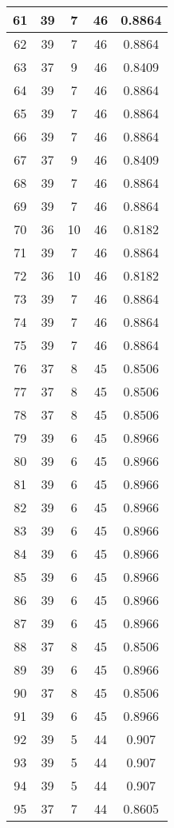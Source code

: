 \documentclass[letterpaper, 12pt]{article}
\begin{document}
\begin{longtable}{|c|c|c|c|c|}
61 & 39 & 7 & 46 & 0.8864 \\
\hline
62 & 39 & 7 & 46 & 0.8864 \\
\hline
63 & 37 & 9 & 46 & 0.8409 \\
\hline
64 & 39 & 7 & 46 & 0.8864 \\
\hline
65 & 39 & 7 & 46 & 0.8864 \\
\hline
66 & 39 & 7 & 46 & 0.8864 \\
\hline
67 & 37 & 9 & 46 & 0.8409 \\
\hline
68 & 39 & 7 & 46 & 0.8864 \\
\hline
69 & 39 & 7 & 46 & 0.8864 \\
\hline
70 & 36 & 10 & 46 & 0.8182 \\
\hline
71 & 39 & 7 & 46 & 0.8864 \\
\hline
72 & 36 & 10 & 46 & 0.8182 \\
\hline
73 & 39 & 7 & 46 & 0.8864 \\
\hline
74 & 39 & 7 & 46 & 0.8864 \\
\hline
75 & 39 & 7 & 46 & 0.8864 \\
\hline
76 & 37 & 8 & 45 & 0.8506 \\
\hline
77 & 37 & 8 & 45 & 0.8506 \\
\hline
78 & 37 & 8 & 45 & 0.8506 \\
\hline
79 & 39 & 6 & 45 & 0.8966 \\
\hline
80 & 39 & 6 & 45 & 0.8966 \\
\hline
81 & 39 & 6 & 45 & 0.8966 \\
\hline
82 & 39 & 6 & 45 & 0.8966 \\
\hline
83 & 39 & 6 & 45 & 0.8966 \\
\hline
84 & 39 & 6 & 45 & 0.8966 \\
\hline
85 & 39 & 6 & 45 & 0.8966 \\
\hline
86 & 39 & 6 & 45 & 0.8966 \\
\hline
87 & 39 & 6 & 45 & 0.8966 \\
\hline
88 & 37 & 8 & 45 & 0.8506 \\
\hline
89 & 39 & 6 & 45 & 0.8966 \\
\hline
90 & 37 & 8 & 45 & 0.8506 \\
\hline
91 & 39 & 6 & 45 & 0.8966 \\
\hline
92 & 39 & 5 & 44 & 0.907 \\
\hline
93 & 39 & 5 & 44 & 0.907 \\
\hline
94 & 39 & 5 & 44 & 0.907 \\
\hline
95 & 37 & 7 & 44 & 0.8605 \\

\end{longtable}
\end{document}
